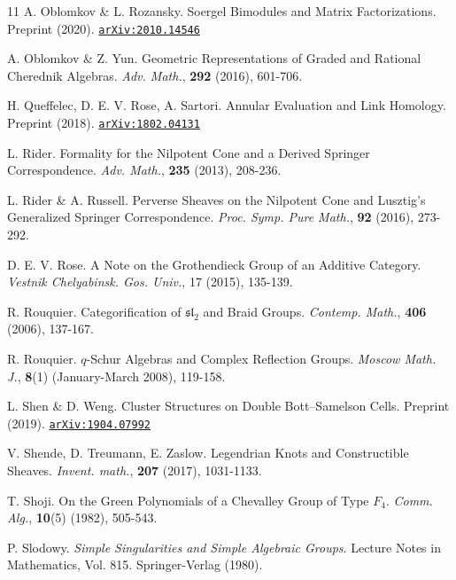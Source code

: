\documentclass[a4paper,10pt,leqno]{amsart}
\theoremstyle{plain}
\theoremstyle{plain}
\theoremstyle{plain}
\theoremstyle{definition}
\theoremstyle{remark}
\begin{document}
\begin{thebibliography}{11}
	A. Oblomkov \& L. Rozansky.
	Soergel Bimodules and Matrix Factorizations.
	Preprint (2020).
	\href{https://arxiv.org/abs/2010.14546}{\texttt{arXiv:2010.14546}}

	A. Oblomkov \& Z. Yun.
	Geometric Representations of Graded and Rational Cherednik Algebras.
	\textsl{Adv. Math.},
	\textbf{292}
	(2016),
	601-706.
	
	
	H. Queffelec, D. E. V. Rose, A. Sartori.
	Annular Evaluation and Link Homology.
	Preprint
	(2018).
	\href{https://arxiv.org/abs/1802.04131}{\texttt{arXiv:1802.04131}}
	
	L. Rider.
	Formality for the Nilpotent Cone and a Derived
Springer Correspondence.
	\textsl{Adv. Math.},
	\textbf{235}
	(2013),
	208-236.
	
	L. Rider \& A. Russell.
	Perverse Sheaves on the Nilpotent Cone and Lusztig's Generalized Springer Correspondence.
	\textsl{Proc. Symp. Pure Math.},
	\textbf{92}
	(2016),
	273-292.

	D. E. V. Rose.
	A Note on the Grothendieck Group of an Additive Category.
	\textsl{Vestnik Chelyabinsk. Gos. Univ.},
	17
	(2015),
	135-139.

	R. Rouquier.
	Categorification of $\mathfrak{sl}_2$ and Braid Groups.
	\textsl{Contemp. Math.},
	\textbf{406}
	(2006),
	137-167.

	R. Rouquier.
	$q$-Schur Algebras and Complex Reflection Groups.
	\textsl{Moscow Math. J.},
	\textbf{8}(1)
	(January-March 2008),
	119-158.

	L. Shen \& D. Weng.
	Cluster Structures on Double Bott--Samelson Cells.
	Preprint
	(2019).
	\href{http://arxiv.org/abs/1904.07992}{\texttt{arXiv:1904.07992}}

	V. Shende, D. Treumann, E. Zaslow.
	Legendrian Knots and Constructible Sheaves.
	\textsl{Invent. math.},
	\textbf{207}
	(2017),
	1031-1133.

	T. Shoji.
	On the Green Polynomials of a Chevalley Group of Type $F_4$.
	\textsl{Comm. Alg.},
	\textbf{10}(5)
	(1982),
	505-543.

	P. Slodowy.
	\textsl{Simple Singularities and Simple Algebraic Groups}.
	Lecture Notes in Mathematics, Vol. 815.
	Springer-Verlag
	(1980).


\end{thebibliography}
\end{document}
